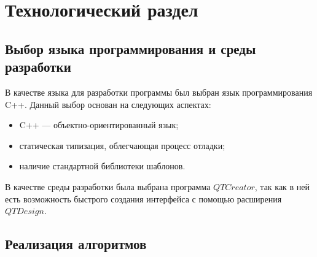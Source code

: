 \chapter{Технологический раздел}

\section{Выбор языка программирования и среды разработки}

В качестве языка для разработки программы был выбран язык программирования C++. Данный выбор основан на следующих аспектах:
\begin{itemize}[label=---]
    \item C++ --- объектно-ориентированный язык;
    \item статическая типизация, облегчающая процесс отладки;
    \item наличие стандартной библиотеки шаблонов.
\end{itemize}

В качестве среды разработки была выбрана программа $QT Creator$, так как в ней есть возможность быстрого создания интерфейса с помощью расширения $QTDesign$.

\section{Реализация алгоритмов}

